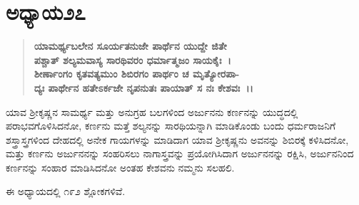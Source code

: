 \section*{ಅಧ್ಯಾಯ\enginline{-}೨೭}

\begin{verse}
\textbf{ಯಾಮರ್ಥ್ಯಬಲೇನ ಸೂರ್ಯತನುಜೇ ಪಾರ್ಥೆನ ಯುದ್ದೇ ಜಿತೇ}\\\textbf{ಪಶ್ಚಾತ್ ಶಲ್ಯಮವಾಸ್ಯ ಸಾರಥಿವರಂ ಧರ್ಮಾತ್ಮಜಂ ಸಾಯಕೈಃ~।}\\\textbf{ಶೀರ್ಣಾಂಗಂ ಕೃತವತ್ಯಮುಂ ಶಿಬಿರಗಂ ಪಾರ್ಥಂ ಚ ಮೃತ್ಯೋರಪಾ-}\\\textbf{ದ್ಯಃ ಪಾರ್ಥೇನ ಹತೇಽರ್ಕಜೇ ನೃಪನುತಃ ಪಾಯಾತ್ ಸ ನಃ ಕೇಶವಃ~।।}
\end{verse}

ಯಾವ ಶ‍್ರೀಕೃಷ್ಣನ ಸಾಮರ್ಥ್ಯ ಮತ್ತು ಅನುಗ್ರಹ ಬಲಗಳಿಂದ ಅರ್ಜುನನು ಕರ್ಣನನ್ನು ಯುದ್ಧದಲ್ಲಿ ಪರಾಭವಗೊಳಿಸಿದನೋ, ಕರ್ಣನು ಮತ್ತೆ ಶಲ್ಯನನ್ನು ಸಾರಥಿಯನ್ನಾಗಿ ಮಾಡಿಕೊಂಡು ಬಂದು ಧರ್ಮರಾಜನಿಗೆ ಶಸ್ತ್ರಾಸ್ತ್ರಗಳಿಂದ ದೇಹದಲ್ಲಿ ಅನೇಕ ಗಾಯಗಳನ್ನು ಮಾಡಿದಾಗ ಯಾವ ಶ‍್ರೀಕೃಷ್ಣನು ಅವನನ್ನು ಶಿಬಿರಕ್ಕೆ ಕಳಿಸಿದನೋ, ಮತ್ತು ಕರ್ಣನು ಅರ್ಜುನನನ್ನು ಸಂಹರಿಸಲು ನಾಗಾಸ್ತ್ರವನ್ನು ಪ್ರಯೋಗಿಸಿದಾಗ ಅರ್ಜುನನನ್ನು ರಕ್ಷಿಸಿ, ಅರ್ಜುನನಿಂದ ಕರ್ಣನನ್ನು ಸಂಹಾರ ಮಾಡಿಸಿದನೋ ಅಂತಹ ಕೇಶವನು ನಮ್ಮನು ಸಲಹಲಿ.

ಈ ಅಧ್ಯಾಯದಲ್ಲಿ ೧೯೨ ಶ್ಲೋಕಗಳಿವೆ.

\newpage

